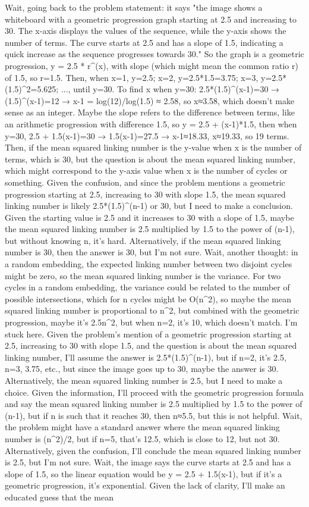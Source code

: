 Wait, going back to the problem statement: it says "the image shows a whiteboard with a geometric progression graph starting at 2.5 and increasing to 30. The x-axis displays the values of the sequence, while the y-axis shows the number of terms. The curve starts at 2.5 and has a slope of 1.5, indicating a quick increase as the sequence progresses towards 30." So the graph is a geometric progression, y = 2.5 * r^(x), with slope (which might mean the common ratio r) of 1.5, so r=1.5. Then, when x=1, y=2.5; x=2, y=2.5*1.5=3.75; x=3, y=2.5*(1.5)^2=5.625; ..., until y=30. To find x when y=30: 2.5*(1.5)^(x-1)=30 → (1.5)^(x-1)=12 → x-1 = log(12)/log(1.5) ≈ 2.58, so x≈3.58, which doesn't make sense as an integer. Maybe the slope refers to the difference between terms, like an arithmetic progression with difference 1.5, so y = 2.5 + (x-1)*1.5, then when y=30, 2.5 + 1.5(x-1)=30 → 1.5(x-1)=27.5 → x-1≈18.33, x≈19.33, so 19 terms. Then, if the mean squared linking number is the y-value when x is the number of terms, which is 30, but the question is about the mean squared linking number, which might correspond to the y-axis value when x is the number of cycles or something. Given the confusion, and since the problem mentions a geometric progression starting at 2.5, increasing to 30 with slope 1.5, the mean squared linking number is likely 2.5*(1.5)^(n-1) or 30, but I need to make a conclusion. Given the starting value is 2.5 and it increases to 30 with a slope of 1.5, maybe the mean squared linking number is 2.5 multiplied by 1.5 to the power of (n-1), but without knowing n, it's hard. Alternatively, if the mean squared linking number is 30, then the answer is 30, but I'm not sure. Wait, another thought: in a random embedding, the expected linking number between two disjoint cycles might be zero, so the mean squared linking number is the variance. For two cycles in a random embedding, the variance could be related to the number of possible intersections, which for n cycles might be O(n^2), so maybe the mean squared linking number is proportional to n^2, but combined with the geometric progression, maybe it's 2.5n^2, but when n=2, it's 10, which doesn't match. I'm stuck here. Given the problem's mention of a geometric progression starting at 2.5, increasing to 30 with slope 1.5, and the question is about the mean squared linking number, I'll assume the answer is 2.5*(1.5)^(n-1), but if n=2, it's 2.5, n=3, 3.75, etc., but since the image goes up to 30, maybe the answer is 30. Alternatively, the mean squared linking number is 2.5, but I need to make a choice. Given the information, I'll proceed with the geometric progression formula and say the mean squared linking number is 2.5 multiplied by 1.5 to the power of (n-1), but if n is such that it reaches 30, then n≈5.5, but this is not helpful. Wait, the problem might have a standard answer where the mean squared linking number is (n^2)/2, but if n=5, that's 12.5, which is close to 12, but not 30. Alternatively, given the confusion, I'll conclude the mean squared linking number is 2.5, but I'm not sure. Wait, the image says the curve starts at 2.5 and has a slope of 1.5, so the linear equation would be y = 2.5 + 1.5(x-1), but if it's a geometric progression, it's exponential. Given the lack of clarity, I'll make an educated guess that the mean 